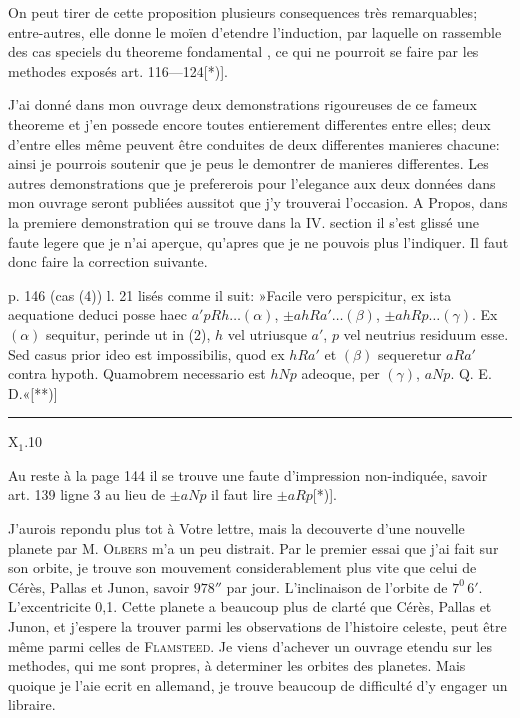 On peut tirer de cette proposition plusieurs consequences très remarquables;
entre-autres, elle donne le moïen d’etendre l’induction, par laquelle
on rassemble des cas speciels du theoreme fondamental , ce qui ne pourroit se faire par les methodes exposés art. 116—124[*)].

J’ai donné dans mon ouvrage deux demonstrations rigoureuses de ce fameux
theoreme et j’en possede encore  toutes entierement differentes
entre elles; deux d’entre elles même peuvent être conduites de deux differentes
manieres chacune: ainsi je pourrois soutenir que je peus le demontrer de
 manieres differentes. Les autres demonstrations que je prefererois pour
l’elegance aux deux données dans mon ouvrage seront publiées aussitot que
j’y trouverai l’occasion. A Propos, dans la premiere demonstration qui se
trouve dans la IV. section il s’est glissé une faute legere que je n’ai aperçue,
qu’apres que je ne pouvois plus l’indiquer. Il faut donc faire la correction
suivante.

p. 146 (cas (4)) l. 21 lisés comme il suit: »Facile vero perspicitur, ex
ista aequatione deduci posse haec $a'pRh\ldots(\alpha)$, $\pm ahRa'\ldots(\beta)$, $\pm ahRp\ldots(\gamma)$.
Ex $(\alpha)$ sequitur, perinde ut in (2), $h$ vel utriusque $a'$, $p$ vel neutrius residuum
esse. Sed casus prior ideo est impossibilis, quod ex $hRa'$ et $(\beta)$ sequeretur
$aRa'$ contra hypoth. Quamobrem necessario est $hNp$ adeoque, per $(\gamma)$, $aNp$.
Q. E. D.«[**)]
\par\vfill\noindent\rule{.25\linewidth}{.4pt}\par\smallskip
\begingroup\footnotesize
\noindent[*) Werke I, S. 87—94.]\par
{}\par
\endgroup
\noindent X$_1$.\hfill10\par\clearpage
{}
\par\indent Au reste à la page 144 il se trouve une faute d’impression non-indiquée,
savoir art. 139 ligne 3 au lieu de $\pm aNp$ il faut lire $\pm aRp$[*)].

J’aurois repondu plus tot à Votre lettre, mais la decouverte d’une nouvelle
planete par M. \textsc{Olbers} m’a un peu distrait. Par le premier essai que
j’ai fait sur son orbite, je trouve son mouvement considerablement plus vite
que celui de Cérès, Pallas et Junon, savoir $978''$ par jour. L’inclinaison de
l’orbite de $7^0\,6'$. L’excentricite 0,1. Cette planete a beaucoup plus de clarté
que Cérès, Pallas et Junon, et j’espere la trouver parmi les observations de
l’histoire celeste, peut être même parmi celles de \textsc{Flamsteed}. Je viens
d’achever un ouvrage etendu sur les methodes, qui me sont propres, à determiner
les orbites des planetes. Mais quoique je l’aie ecrit en allemand, je
trouve beaucoup de difficulté d’y engager un libraire.

